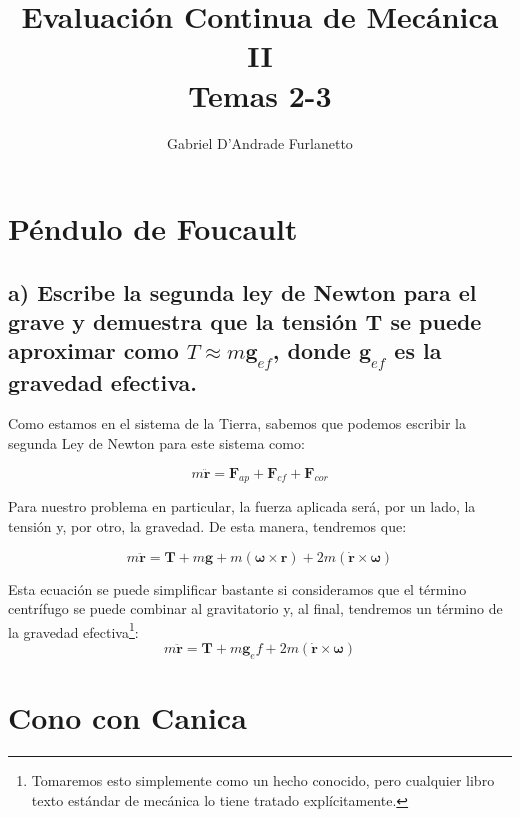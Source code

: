 \documentclass[a4paper,12pt]{article}
\begin{document}
\title{Evaluación Continua de Mecánica II\\ Temas 2-3}
\author{Gabriel D'Andrade Furlanetto}
\maketitle 

\section{Péndulo de Foucault}

\subsection*{a) Escribe la segunda ley de Newton para el grave y demuestra que la tensión $\boldsymbol{T}$ se puede aproximar como $T \approx m\boldsymbol{g}_{ef}$, donde $\boldsymbol{g}_{ef}$ es la gravedad efectiva.}

Como estamos en el sistema de la Tierra, sabemos que podemos escribir la segunda Ley de Newton para este sistema como:

\begin{equation}
  m\ddot{\boldsymbol{r}} = \boldsymbol{F}_{ap} + \boldsymbol{F}_{cf} + \boldsymbol{F}_{cor}
\end{equation}

Para nuestro problema en particular, la fuerza aplicada será, por un lado, la tensión y, por otro, la gravedad. De esta manera, tendremos que:

\begin{equation}
  m \ddot{\boldsymbol{r}} = \boldsymbol{T} + m\boldsymbol{g} + m(\boldsymbol{\omega} \times \boldsymbol{r}) + 2m (\dot{\boldsymbol{r}} \times \boldsymbol{\omega})
\end{equation}

Esta ecuación se puede simplificar bastante si consideramos que el término centrífugo se puede combinar al gravitatorio y, al final, tendremos un término de la gravedad efectiva\footnote{Tomaremos esto simplemente como un hecho conocido, pero cualquier libro texto estándar de mecánica lo tiene tratado explícitamente.}:
\begin{equation}
  m \ddot{\boldsymbol{r}} = \boldsymbol{T} + m\boldsymbol{g}_ef + 2m (\dot{\boldsymbol{r}} \times \boldsymbol{\omega})
\end{equation}


\section{Cono con Canica}
\end{document}

